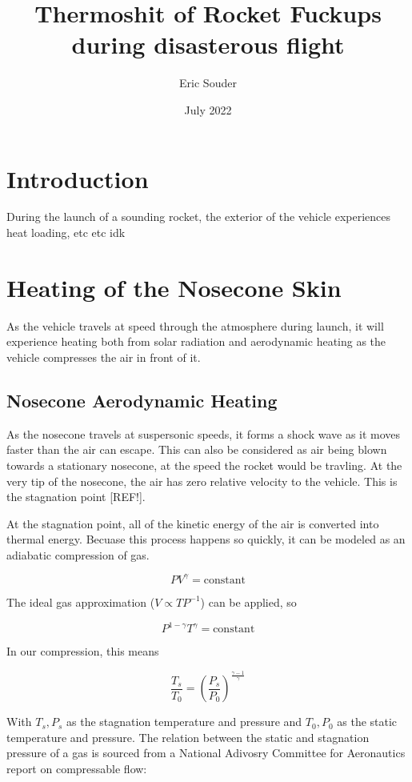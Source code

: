 \documentclass[twocolumn]{article}
\title{Thermoshit of Rocket Fuckups during disasterous flight}
\author{Eric Souder}
\date{July 2022}
\begin{document}
    \maketitle
    \begin{abstract}
    \end{abstract}
    \section{Introduction}
        During the launch of a sounding rocket, the exterior of the vehicle experiences
        heat loading, etc etc idk

    \section{Heating of the Nosecone Skin}
        As the vehicle travels at speed through the atmosphere during launch, it
        will experience heating both from solar radiation and 
        aerodynamic heating as the vehicle compresses the air in front of it.
        \subsection{Nosecone Aerodynamic Heating}
            As the nosecone travels at suspersonic speeds, it forms a shock wave
            as it moves faster than the air can escape. This can also be
            considered as air being blown towards a stationary nosecone, at the
            speed the rocket would be travling. At the very tip of
            the nosecone, the air has zero relative velocity to the vehicle. 
            This is the stagnation point [REF!].

            At the stagnation point, all of the kinetic energy of the air is 
            converted into thermal energy. Becuase this process happens so
            quickly, it can be modeled as an adiabatic compression of gas.

            \[PV^\gamma = \textrm{constant}\]

            The ideal gas approximation ($V\propto TP^{-1}$) can be applied, so 

            \[P^{1-\gamma}T^\gamma=\textrm{constant}\]

            In our compression, this means 

            \[\frac{T_s}{T_0}=\left(\frac{P_s}{P_0}\right)^\frac{\gamma-1}{\gamma}\]

            With $T_s, P_s$ as the stagnation temperature and pressure and 
            $T_0, P_0$ as the static temperature and pressure. The relation 
            between the static and stagnation pressure of a gas is sourced from 
            a National Adivosry Committee for Aeronautics report on compressable 
            flow:
\end{document}
